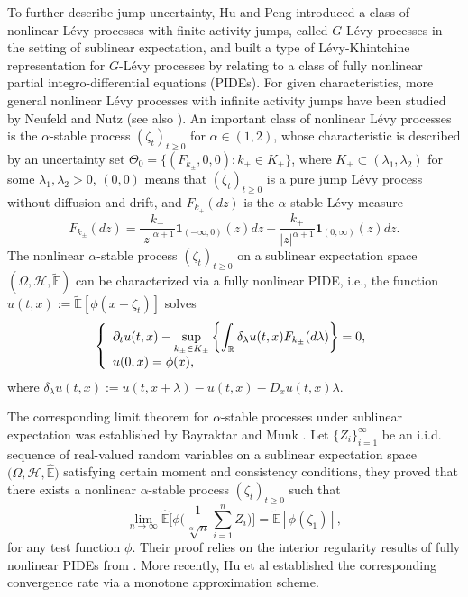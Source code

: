 \documentclass[a4paper,oneside,10pt]{article}%
\numberwithin{equation}{section}
\begin{document}
To further describe jump uncertainty, Hu and Peng \cite{HP2009,HP2021}
introduced a class of nonlinear L\'{e}vy processes with finite activity jumps,
called $G$-L\'{e}vy processes in the setting of sublinear expectation, and
built a type of L\'{e}vy-Khintchine representation for $G$-L\'{e}vy processes
by relating to a class of fully nonlinear partial integro-differential
equations (PIDEs).
For given characteristics, more general nonlinear L\'{e}vy processes with
infinite activity jumps have been studied by Neufeld and Nutz \cite{NN2017}
(see also \cite{DKN2020,Kuhn2019,NR2021}). An important class of nonlinear
L\'{e}vy processes is the $\alpha$-stable process $(\zeta_{t})_{t\geq0}$ for
$\alpha \in(1,2)$, whose characteristic is described by an uncertainty set
$\Theta_{0}=\{(F_{k_{\pm}},0,0):k_{\pm}\in K_{\pm}\}$, where $K_{\pm}%
\subset(\lambda_{1},\lambda_{2})$ for some $\lambda_{1},\lambda_{2}>0$,
$(0,0)$ means that $(\zeta_{t})_{t\geq0}$ is a pure jump L\'{e}vy process
without diffusion and drift, and $F_{k_{\pm}}(dz)$ is the $\alpha$-stable
L\'{e}vy measure
\[
F_{k_{\pm}}(dz)=\frac{k_{-}}{|z|^{\alpha+1}}\mathbf{1}_{(-\infty
,0)}(z)dz+\frac{k_{+}}{|z|^{\alpha+1}}\mathbf{1}_{(0,\infty)}(z)dz.
\]
The nonlinear $\alpha$-stable process $(\zeta_{t})_{t\geq0}$ on a sublinear
expectation space $(\Omega,\mathcal{H},\mathbb{\tilde{E}})$ can be
characterized via a fully nonlinear PIDE, i.e., the function
$u(t,x):=\mathbb{\tilde{E}}[\phi(x+\zeta_{t})]$ solves
\begin{equation}
\left \{
\begin{array}
[c]{l}%
\displaystyle \partial_{t}u(t,x)-\sup \limits_{k_{\pm}\in K_{\pm}}\left \{
\int_{\mathbb{R}}\delta_{\lambda}u(t,x)F_{k_{\pm}}(d\lambda)\right \}  =0,\\
\displaystyle u(0,x)=\phi(x),
\end{array}
\right.  \label{0.2}%
\end{equation}
where $\delta_{\lambda}u(t,x):=u(t,x+\lambda)-u(t,x)-D_{x}u(t,x)\lambda$.

The corresponding limit theorem for $\alpha$-stable processes under sublinear
expectation was established by Bayraktar and Munk \cite{BM2016}. Let
$\{Z_{i}\}_{i=1}^{\infty}$ be an i.i.d. sequence of real-valued random
variables on a sublinear expectation space $(\Omega,\mathcal{H},\mathbb{\hat
{E})}$ satisfying certain moment and consistency conditions, they proved that
there exists a nonlinear $\alpha$-stable process $(\zeta_{t})_{t\geq0}$ such
that
\[
\lim_{n\rightarrow \infty}\mathbb{\hat{E}}\bigg[\phi \bigg(\frac{1}%
{\sqrt[\alpha]{n}}\sum_{i=1}^{n} Z_{i}\bigg)\bigg]=\mathbb{\tilde{E}}%
[\phi(\zeta_{1})],
\]
for any test function $\phi$. Their proof relies on the interior regularity
results of fully nonlinear PIDEs from \cite{CC1995,LD20161,LD20162}. More
recently, Hu et al \cite{HJL2021} established the corresponding convergence
rate via a monotone approximation scheme.
\end{document}
